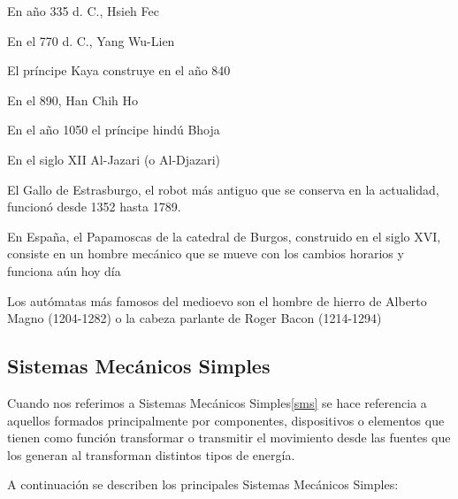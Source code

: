 \documentclass[paper=a4, fontsize=11pt]{scrartcl}
\begin{document}
En año 335 d. C., Hsieh Fec

En el 770 d. C., Yang Wu-Lien 

El príncipe Kaya construye en el año 840

En el 890, Han Chih Ho

En el año 1050 el príncipe hindú Bhoja

En el siglo XII Al-Jazari (o Al-Djazari)

El Gallo de Estrasburgo, el robot más antiguo que se conserva en la actualidad, funcionó desde 1352 hasta 1789.

En España, el Papamoscas de la catedral de Burgos, construido en el siglo XVI, consiste en un hombre mecánico que se mueve con los cambios horarios y funciona aún hoy día

Los autómatas más famosos del medioevo son el hombre de hierro de Alberto Magno (1204-1282) o la cabeza parlante de Roger Bacon (1214-1294)





 

\subsection{Sistemas Mecánicos Simples}

Cuando nos referimos a Sistemas Mecánicos Simples\ref{sms} se hace referencia a aquellos formados principalmente por componentes, dispositivos o elementos que tienen como función transformar o transmitir el movimiento desde las fuentes que los generan al transforman distintos tipos de energía.

A continuación se describen los principales Sistemas Mecánicos Simples:
\end{document}
